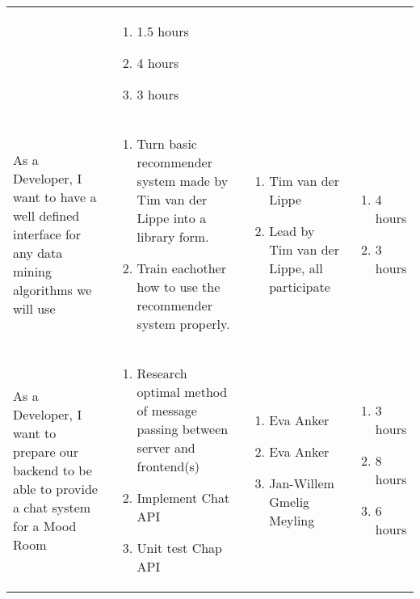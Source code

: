 \documentclass[11pt,a4paper]{article}
\begin{document}
\begin{table}[h]
\begin{tabular}{|p{4.5cm}|p{7cm}|p{4cm}|p{2.6cm}|}
& 
\begin{enumerate}
\item 1.5 hours
\item 4 hours
\item 3 hours
\end{enumerate} \\

As a Developer, I want to have a well defined interface for any data mining algorithms we will use & \begin{enumerate}
\item Turn basic recommender system made by Tim van der Lippe into a library form.
\item Train eachother how to use the recommender system properly.
\end{enumerate}

& 
\begin{enumerate}
\item Tim van der Lippe
\item Lead by Tim van der Lippe, all participate
\end{enumerate}

& 
\begin{enumerate}
\item 4 hours
\item 3 hours
\end{enumerate} \\

As a Developer, I want to prepare our backend to be able to provide a chat system for a Mood Room & \begin{enumerate}
\item Research optimal method of message passing between server and frontend(s)
\item Implement Chat API
\item Unit test Chap API
\end{enumerate}

& 
\begin{enumerate}
\item Eva Anker
\item Eva Anker
\item Jan-Willem Gmelig Meyling
\end{enumerate}

& 
\begin{enumerate}
\item 3 hours
\item 8 hours
\item 6 hours
\end{enumerate} \\
           
\end{tabular}
\end{table}
\end{document}
